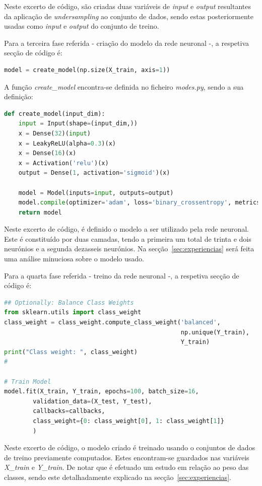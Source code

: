 \documentclass[]{article}
\begin{document}
Neste excerto de código, são criadas duas variáveis de \textit{input} e \textit{output} resultantes da aplicação de \textit{undersampling} ao conjunto de dados, sendo estas posteriormente usadas como \textit{input} e \textit{output} do conjunto de treino.

Para a terceira fase referida - criação do modelo da rede neuronal -, a respetiva secção de código é:
\begin{lstlisting}[language=python]
model = create_model(np.size(X_train, axis=1))
\end{lstlisting}
A função \textit{create\_model} encontra-se definida no ficheiro \textit{modes.py}, sendo a sua definição:
\begin{lstlisting}[language=python]
def create_model(input_dim):
    input = Input(shape=(input_dim,))
    x = Dense(32)(input)
    x = LeakyReLU(alpha=0.3)(x)
    x = Dense(16)(x)
    x = Activation('relu')(x)
    output = Dense(1, activation='sigmoid')(x)

    model = Model(inputs=input, outputs=output)
    model.compile(optimizer='adam', loss='binary_crossentropy', metrics=['accuracy'])
    return model
\end{lstlisting}
Neste excerto de código, é definido o modelo a ser utilizado pela rede neuronal. Este é constituído por duas camadas, tendo a primeira um total de trinta e dois neurónios e a segunda dezasseis neurónios. Na secção~\ref{sec:experiencias} será feita uma análise minuciosa sobre o modelo usado.

Para a quarta fase referida - treino da rede neuronal -, a respetiva secção de código é:
\begin{lstlisting}[language=python]
## Optionally: Balance Class Weights
from sklearn.utils import class_weight
class_weight = class_weight.compute_class_weight('balanced',
                                                 np.unique(Y_train),
                                                 Y_train)
print("Class weight: ", class_weight)
#

# Train Model
model.fit(X_train, Y_train, epochs=100, batch_size=16,
        validation_data=(X_test, Y_test),
        callbacks=callbacks,
        class_weight={0: class_weight[0], 1: class_weight[1]}
        )
\end{lstlisting}
Neste excerto de código, o modelo criado é treinado usando o conjuntos de dados de treino previamente computados. Estes encontram-se guardados nas variáveis \textit{X\_train} e \textit{Y\_train}. De notar que é efetuado um estudo em relação ao peso das classes, sendo este detalhadamente explicado na secção~\ref{sec:experiencias}.
\end{document}
